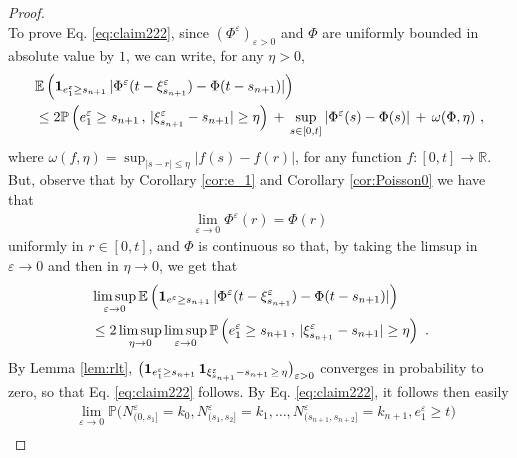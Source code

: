 \documentclass[reqno, 12pt, a4paper]{amsart}
\theoremstyle{plain}
\theoremstyle{definition}
\begin{document}
\begin{proof}
\begin{equation}
\end{equation}
To prove Eq. \eqref{eq:claim222}, since $(\Phi^\varepsilon)_{\varepsilon>0}$ and $\Phi$ are uniformly bounded in absolute value by $1$, we can write, for any $\eta>0$, 
\begin{equation}
\begin{split}
&\mathbb E  \left( {\bf 1}_{e_1^\varepsilon \ge s_{n+1}} \,  \vert \Phi^\varepsilon (t-\xi_{s_{n+1}}^\varepsilon) - \Phi (t -s_{n+1}) \vert \right) \\
& \le 2 \mathbb P  \left( e_1^\varepsilon \ge s_{n+1} \, , \,  \vert \xi_{s_{n+1}}^\varepsilon - s_{n+1} \vert \ge \eta  \right) \, + \, \sup_{s\in [0,t]} | \Phi^\varepsilon (s) - \Phi (s)| \, +\,  \omega( \Phi, \eta) \ , 
\end{split}
\end{equation}
where $\omega (f, \eta) = \sup_{|s-r| \le \eta} |f(s) -f(r)|$, for any function $f:[0,t] \to \mathbb R$. But, observe that by Corollary \ref{cor:e_1} and Corollary \ref{cor:Poisson0} we have that 
\begin{equation}
\label{eq:uniformPhi}
\begin{split}
\lim_{\varepsilon \to 0 } \Phi^\varepsilon (r) =\Phi(r) 
\end{split}
\end{equation}
uniformly in $r \in [0,t]$, and $\Phi$ is continuous so that, by taking the limsup in $\varepsilon \to 0$ and then in $\eta \to 0$, we get that 
\begin{equation}
\begin{split}
&\limsup_{\varepsilon \to 0} \mathbb E  \left( {\bf 1}_{e^\varepsilon \ge s_{n+1}} \,  \vert \Phi^\varepsilon (t-\xi_{s_{n+1}}^\varepsilon) - \Phi (t -s_{n+1}) \vert \right)\\
& \le 2 \limsup_{\eta \to 0} \limsup_{\varepsilon \to 0}  \mathbb P  \left( e_1^\varepsilon \ge s_{n+1} \, , \,  \vert \xi_{s_{n+1}}^\varepsilon - s_{n+1} \vert \ge \eta  \right) \ .
\end{split}
\end{equation}
By Lemma  \ref{lem:rlt}, $\big({\bf 1}_{e^\varepsilon_1 \ge s_{n+1}} \, {\bf 1}_{ \xi_{s_{n+1}}^\varepsilon - s_{n+1} \, \ge \,  \eta} \big)_{\varepsilon>0}$ converges in probability to zero, so that Eq. \eqref{eq:claim222} follows. By Eq. \eqref{eq:claim222}, it follows then easily  
\begin{equation}
\begin{split}
&\lim_{\varepsilon \to 0} \mathbb P \Big (N_{(0,s_1]}^\varepsilon =k_0, N^\varepsilon_{(s_1,s_2]} = k_1, \ldots,  N^\varepsilon_{(s_{n+1},s_{n+2}]} = k_{n+1}, e_1^{\varepsilon} \ge t \Big) \\ 

\end{split}
\end{equation}
\end{proof}
\end{document}
